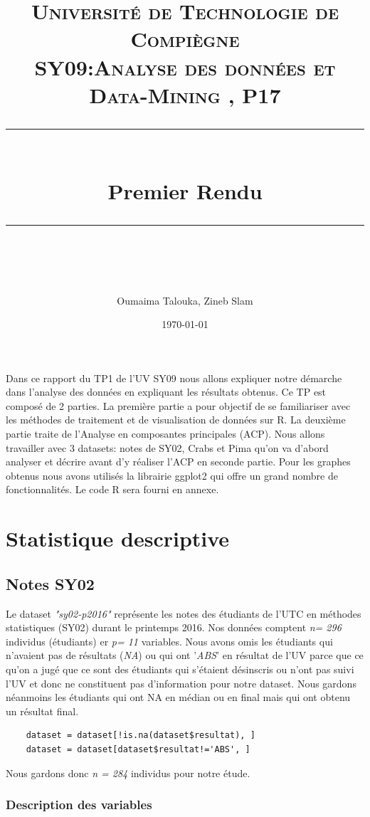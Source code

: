 \documentclass[10pt]{article}
\title{
	\normalfont \normalsize 
	\textsc{Université de Technologie de Compiègne\\ 
		SY09:Analyse des données et Data-Mining , P17} \\
	[10pt] 
	\rule{\linewidth}{0.5pt} \\[6pt] 
	\huge Premier Rendu \\
	\rule{\linewidth}{2pt}  \\[10pt]
}
\author{Oumaima Talouka, Zineb Slam}
\date{\normalsize \today}
\begin{document}
	
	{\let\newpage\relax\maketitle}
	
	Dans ce rapport du TP1 de l'UV SY09 nous allons expliquer notre démarche dans l'analyse des données en expliquant les résultats obtenus. Ce TP est composé de 2 parties. La première partie a pour objectif de se familiariser avec les méthodes de traitement et de visualisation de données sur R. La deuxième partie traite de l'Analyse en composantes principales (ACP). Nous allons travailler avec 3 datasets: notes de SY02, Crabs et Pima qu'on va d'abord analyser et décrire avant d'y réaliser l'ACP en seconde partie. Pour les graphes obtenus nous avons utilisés la librairie ggplot2 qui offre un grand nombre de fonctionnalités. Le code R sera fourni en annexe.
	
	
	
	
	\section{ Statistique descriptive}
	
	\subsection{Notes SY02}
	Le dataset \textit{"sy02-p2016"} représente les notes des étudiants de l'UTC en méthodes statistiques (SY02) durant le printemps 2016. Nos données comptent \textit{n= 296} individus (étudiants) er \textit{p= 11} variables. Nous avons omis  les étudiants qui n'avaient pas de résultats (\textit{NA}) ou qui ont '\textit{ABS}' en résultat de l'UV parce que ce qu'on a  jugé que ce sont des étudiants qui s'étaient désinscris ou n'ont pas suivi l'UV et donc ne constituent pas d'information pour notre dataset. Nous gardons néanmoins les étudiants qui ont NA en médian ou en final mais qui ont obtenu un résultat final. 
	
	\begin{lstlisting}
	dataset = dataset[!is.na(dataset$resultat), ]
	dataset = dataset[dataset$resultat!='ABS', ]
	\end{lstlisting}
	
	Nous gardons donc \textit{n = 284} individus pour notre étude.
	
	\subsubsection{Description des variables}
	
\end{document}
